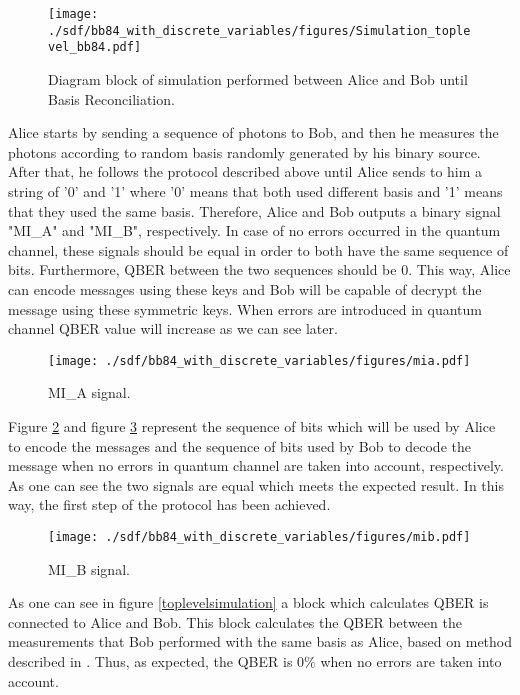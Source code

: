 \begin{refsection}
\begin{figure}[h]
    \centering
        \texttt{[image: ./sdf/bb84\_with\_discrete\_variables/figures/Simulation\_toplevel\_bb84.pdf]}
    \caption{Diagram block of simulation performed between Alice and Bob until Basis Reconciliation. }\label{toplevelalicebob}
\end{figure}

Alice starts by sending a sequence of photons to Bob, and then he measures the photons according to random basis randomly generated by his binary source. After that, he follows the protocol described above until Alice sends to him a string of '0' and '1' where '0' means that both used different basis and '1' means that they used the same basis. Therefore, Alice and Bob outputs a binary signal "MI\_A" and "MI\_B", respectively. In case of no errors occurred in the quantum channel, these signals should be equal in order to both have the same sequence of bits. Furthermore, QBER between the two sequences should be $0$. This way, Alice can encode messages using these keys and Bob will be capable of decrypt the message using these symmetric keys. When errors are introduced in quantum channel QBER value will increase as we can see later.

\begin{figure}[H]
    \centering
        \texttt{[image: ./sdf/bb84\_with\_discrete\_variables/figures/mia.pdf]}
    \caption{MI\_A signal. }\label{mia}
\end{figure}

Figure \ref{mia} and figure \ref{mib} represent the sequence of bits which will be used by Alice to encode the messages and the sequence of bits used by Bob to decode the message when no errors in quantum channel are taken into account, respectively. As one can see the two signals are equal which meets the expected result. In this way, the first step of the protocol has been achieved.

\begin{figure}[h]
    \centering
        \texttt{[image: ./sdf/bb84\_with\_discrete\_variables/figures/mib.pdf]}
    \caption{MI\_B signal. }\label{mib}
\end{figure}

As one can see in figure \ref{toplevelsimulation} a block which calculates QBER is connected to Alice and Bob. This block calculates the QBER between the measurements that Bob performed with the same basis as Alice, based on method described in \cite{Muga11}. Thus, as expected, the QBER is $0 \%$ when no errors are taken into account.


\end{refsection}
